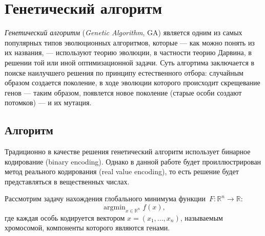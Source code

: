 \chapter{Генетический алгоритм} \label{ParticleSwarmOptimisation}
\noindent
\emph{Генетический алгоритм} (\emph{Genetic Algorithm}, GA) является одним из самых популярных типов эволюционных алгоритмов, которые — как можно понять из их названия, — используют теорию эволюции, в частности теорию Дарвина, в решении той или иной оптимизационной задачи. Суть алгортима заключается в поиске наилучшего решения по принципу естественного отбора: случайным образом создается поколение, в ходе эволюции которого происходит скрещевание генов --- таким образом, появлется новое поколение (старые особи создают потомков) --- и их мутация.

\section{Алгоритм}
\noindent
Традиционно в качестве решения генетический алгоритм использует бинарное кодирование (binary encoding). Однако в данной работе будет проиллюстрирован метод реального кодирования (real value encoding), то есть решение будет представляться в вещественных числах.

Рассмотрим задачу нахождения глобального минимума функции~$F \colon \mathbb{R}^n \to \mathbb{R}$:
\[
	\mathop{\mathrm{argmin}}_{x \in \mathbb{R}^n}f(x),
\]
где каждая особь кодируется вектором $x = (x_1, ..., x_n)$, называемым хромосомой, компоненты которого являются генами.

